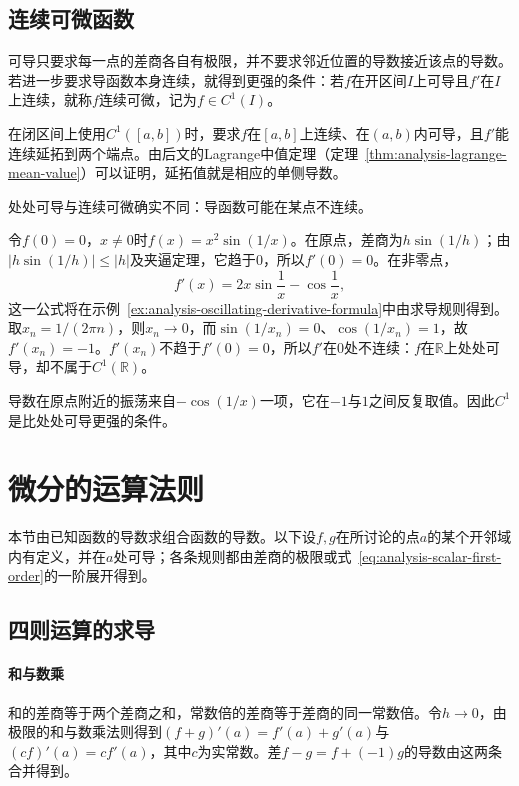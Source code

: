 \subsection{连续可微函数}

可导只要求每一点的差商各自有极限，并不要求邻近位置的导数接近该点的导数。
若进一步要求导函数本身连续，就得到更强的条件：若$f$在开区间$I$上可导且$f'$在$I$上连续，就称$f$连续可微，记为$f\in C^1(I)$。

在闭区间上使用$C^1([a,b])$时，要求$f$在$[a,b]$上连续、在$(a,b)$内可导，且$f'$能连续延拓到两个端点。由后文的Lagrange中值定理（定理~\ref{thm:analysis-lagrange-mean-value}）可以证明，延拓值就是相应的单侧导数。

处处可导与连续可微确实不同：导函数可能在某点不连续。
\begin{example}[处处可导而导函数不连续]
\label{ex:analysis-derivative-not-continuous}
令$f(0)=0$，$x\neq0$时$f(x)=x^2\sin(1/x)$。在原点，差商为$h\sin(1/h)$；由$|h\sin(1/h)|\leq|h|$及夹逼定理，它趋于$0$，所以$f'(0)=0$。在非零点，
\[
 f'(x)=2x\sin\frac1x-\cos\frac1x,
\]
这一公式将在示例~\ref{ex:analysis-oscillating-derivative-formula}中由求导规则得到。取$x_n=1/(2\pi n)$，则$x_n\to0$，而$\sin(1/x_n)=0$、$\cos(1/x_n)=1$，故$f'(x_n)=-1$。$f'(x_n)$不趋于$f'(0)=0$，所以$f'$在$0$处不连续：$f$在$\mathbb R$上处处可导，却不属于$C^1(\mathbb R)$。
\end{example}
导数在原点附近的振荡来自$-\cos(1/x)$一项，它在$-1$与$1$之间反复取值。因此$C^1$是比处处可导更强的条件。

\section{微分的运算法则}
\label{sec:analysis-scalar-chain-rules}

本节由已知函数的导数求组合函数的导数。以下设$f,g$在所讨论的点$a$的某个开邻域内有定义，并在$a$处可导；各条规则都由差商的极限或式~\eqref{eq:analysis-scalar-first-order}的一阶展开得到。

\subsection{四则运算的求导}

\paragraph{和与数乘}
和的差商等于两个差商之和，常数倍的差商等于差商的同一常数倍。令$h\to0$，由极限的和与数乘法则得到$(f+g)'(a)=f'(a)+g'(a)$与$(cf)'(a)=cf'(a)$，其中$c$为实常数。差$f-g=f+(-1)g$的导数由这两条合并得到。

